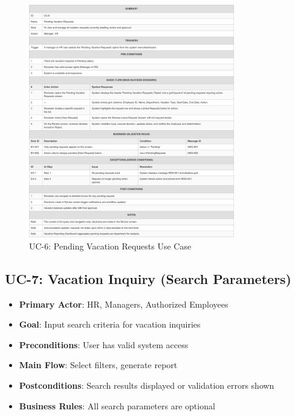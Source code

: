 \documentclass[12pt,a4paper]{article}
\begin{document}
\begin{figure}[H]
\centering
\includegraphics[width=0.8\textwidth]{Use-Cases/UC-6-Pending-Vacation-Requests/UC-6-Pending-Vacation-Requests-1.png}
\caption{UC-6: Pending Vacation Requests Use Case}
\label{fig:uc6}
\end{figure}

\subsection{UC-7: Vacation Inquiry (Search Parameters)}
\begin{itemize}
    \item \textbf{Primary Actor}: HR, Managers, Authorized Employees
    \item \textbf{Goal}: Input search criteria for vacation inquiries
    \item \textbf{Preconditions}: User has valid system access
    \item \textbf{Main Flow}: Select filters, generate report
    \item \textbf{Postconditions}: Search results displayed or validation errors shown
    \item \textbf{Business Rules}: All search parameters are optional
\end{itemize}
\end{document}
